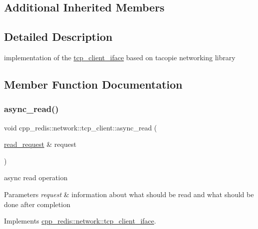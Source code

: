 \subsection*{Additional Inherited Members}


\subsection{Detailed Description}
implementation of the \hyperlink{classcpp__redis_1_1network_1_1tcp__client__iface}{tcp\+\_\+client\+\_\+iface} based on tacopie networking library 

\subsection{Member Function Documentation}
\mbox{\label{classcpp__redis_1_1network_1_1tcp__client_a5eed4225fcd01e3108580d863c94c2cc}} 
\subsubsection{\texorpdfstring{async\+\_\+read()}{async\_read()}}
{\footnotesize\ttfamily void cpp\+\_\+redis\+::network\+::tcp\+\_\+client\+::async\+\_\+read (\begin{DoxyParamCaption}\item[{\hyperlink{structcpp__redis_1_1network_1_1tcp__client__iface_1_1read__request}{read\+\_\+request} \&}]{request }\end{DoxyParamCaption})\hspace{0.3cm}{\ttfamily [virtual]}}

async read operation


\begin{DoxyParams}{Parameters}
{\em request} & information about what should be read and what should be done after completion \\
\hline
\end{DoxyParams}


Implements \hyperlink{classcpp__redis_1_1network_1_1tcp__client__iface_ae1f9fa87002273a0caf340407bb68ade}{cpp\+\_\+redis\+::network\+::tcp\+\_\+client\+\_\+iface}.

\mbox{\label{classcpp__redis_1_1network_1_1tcp__client_a6d15785b71776cd85426c9634cb446f0}} 
